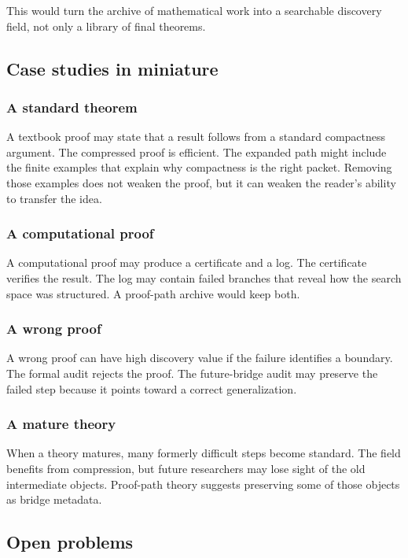 \documentclass[11pt]{article}
\theoremstyle{definition}
\theoremstyle{remark}
\begin{document}
This would turn the archive of mathematical work into a searchable discovery field, not only a library of final theorems.

\subsection{Case studies in miniature}

\subsubsection{A standard theorem}
A textbook proof may state that a result follows from a standard compactness argument.  The compressed proof is efficient.  The expanded path might include the finite examples that explain why compactness is the right packet.  Removing those examples does not weaken the proof, but it can weaken the reader's ability to transfer the idea.

\subsubsection{A computational proof}
A computational proof may produce a certificate and a log.  The certificate verifies the result.  The log may contain failed branches that reveal how the search space was structured.  A proof-path archive would keep both.

\subsubsection{A wrong proof}
A wrong proof can have high discovery value if the failure identifies a boundary.  The formal audit rejects the proof.  The future-bridge audit may preserve the failed step because it points toward a correct generalization.

\subsubsection{A mature theory}
When a theory matures, many formerly difficult steps become standard.  The field benefits from compression, but future researchers may lose sight of the old intermediate objects.  Proof-path theory suggests preserving some of those objects as bridge metadata.

\subsection{Open problems}
\end{document}
